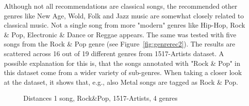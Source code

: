 \noindent Although not all recommendations are classical songs, the recommended other genres like New Age, Wold, Folk and Jazz music are somewhat closely related to classical music. Not a single song from more "modern" genres like Hip-Hop, Rock \& Pop, Electronic \& Dance or Reggae appears.
\noindent The same was tested with five songs from the Rock \& Pop genre (see Figure~\ref{fig:genrerec2}). The results are scattered across 16 out of 19 different genres from 1517-Artists dataset. A possible explanation for this is, that the songs annotated with "Rock \& Pop" in this dataset come from a wider variety of sub-genres. When taking a closer look at the dataset, it shows that, e.g., also Metal songs are tagged as Rock \& Pop.\\
\begin{figure}[htbp]
	\centering
	\caption{Distances 1 song, Rock\&Pop, 1517-Artists, 4 genres}
	\label{fig:corr5}
\end{figure}
\FloatBarrier

